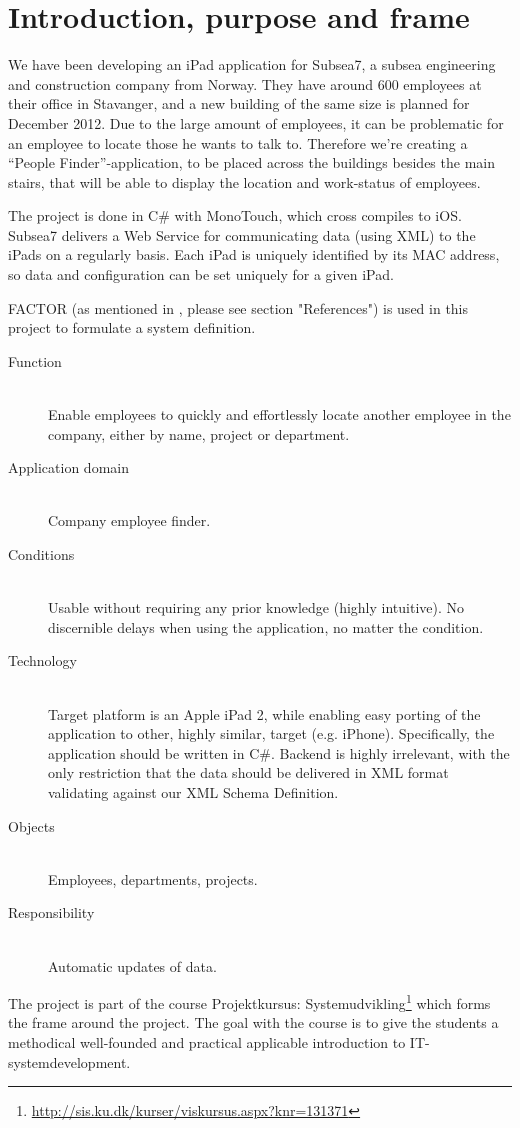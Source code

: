 \section{Introduction, purpose and frame}
We have been developing an iPad application for Subsea7, a subsea engineering and construction company from Norway.
They have around 600 employees at their office in Stavanger, and a new building of the same size is planned for December 2012. Due to the large amount of employees, it can be problematic for an employee to locate those he wants to talk to.
Therefore we're creating a “People Finder”-application, to be placed across the buildings besides the main stairs, that will be able to display the location and work-status of employees.

The project is done in C\# with MonoTouch, which cross compiles to iOS.
Subsea7 delivers a Web Service for communicating  data (using XML) to the iPads on a regularly basis. Each iPad is uniquely identified by its MAC address, so data and configuration can be set uniquely for a given iPad.

FACTOR (as mentioned in \cite{factor}, please see section "References") is used in this project to
formulate a system definition.

\begin{description}
\item[Function] \hfill \\ Enable employees to quickly and effortlessly
  locate another employee in the company, either by name, project or
  department.
\item[Application domain] \hfill \\ Company employee finder.
\item[Conditions] \hfill \\ Usable without requiring any prior
  knowledge (highly intuitive). No discernible delays when using the
  application, no matter the condition.
\item[Technology] \hfill \\ Target platform is an Apple iPad 2, while
  enabling easy porting of the application to other, highly similar,
  target (e.g. iPhone). Specifically, the application should be
  written in C\#. Backend is highly irrelevant, with the only
  restriction that the data should be delivered in XML format
  validating against our XML Schema Definition.
\item[Objects] \hfill \\ Employees, departments, projects.
\item[Responsibility] \hfill \\ Automatic updates of data.
\end{description}

The project is part of the course Projektkursus: Systemudvikling\footnote{\url{http://sis.ku.dk/kurser/viskursus.aspx?knr=131371}}
which forms the frame around the project. The goal with the course is to give the students a methodical well-founded and practical
applicable introduction to IT-systemdevelopment.
